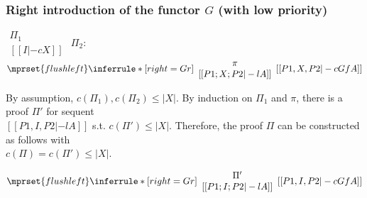 \subsubsection{Right introduction of the functor $G$ (with low priority)}
\begin{center}
  \scriptsize
  \begin{math}
    \begin{array}{c}
      \Pi_1 \\
      {[[I |-c X]]}
    \end{array}
  \end{math}
  \qquad\qquad
  $\Pi_2$:
  \begin{math}
    $$\mprset{flushleft}
    \inferrule* [right={\tiny Gr}] {
      {
        \begin{array}{c}
          \pi \\
          {[[P1; X; P2 |-l A]]}
        \end{array}
      }
    }{[[P1, X, P2 |-c Gf A]]}
  \end{math}
\end{center}
By assumption, $c(\Pi_1),c(\Pi_2)\leq |X|$. By induction on $\Pi_1$
and $\pi$, there is a proof $\Pi'$ for sequent \\
$[[P1, I, P2 |-l A]]$ s.t. $c(\Pi') \leq |X|$. Therefore, the proof $\Pi$
can be constructed as follows with \\
$c(\Pi) = c(\Pi') \leq |X|$.
\begin{center}
  \scriptsize
  \begin{math}
    $$\mprset{flushleft}
    \inferrule* [right={\tiny Gr}] {
      {
        \begin{array}{c}
          \Pi' \\
          {[[P1; I; P2 |-l A]]}
        \end{array}
      }
    }{[[P1, I, P2 |-c Gf A]]}
  \end{math}
\end{center}




